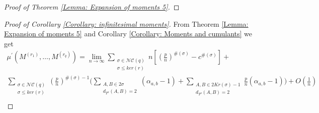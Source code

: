 \documentclass{article}
\newtheorem{corollary}  [theorem]{Corollary}
\theoremstyle{definition}
\newcommand{\E}{\mathbb{E}}
\newcommand{\NC}{\mathcal{NC}}
\begin{document}
{\begin{proof}[Proof of Theorem \ref{Lemma: Expansion of moments 5}]


\end{proof}

\begin{proof}[Proof of Corollary \ref{Corollary: infinitesimal moments}]
From Theorem \ref{Lemma: Expansion of moments 5} and Corollary \ref{Corollary: Moments and cumulants} we get
\begin{multline*}
\mu^\prime(M^{(r_1)},\dots,M^{(r_q)})= 
\lim_{n\rightarrow\infty} \sum_{\substack{\sigma\in \NC(q) \\ \sigma\leq ker(r)}}n\left[\left(\frac{p}{n}\right)^{\#(\sigma)}-c^{\#(\sigma)}\right]+ \\
\sum_{\substack{\sigma\in \NC(q) \\ \sigma\leq ker(r)}}\left(\frac{p}{n}\right)^{\#(\sigma)-1}\Bigg(\sum_{\substack{A,B\in 2\sigma \\ d_{T^\rho}(A,B)=2}}(\alpha_{a,b}-1)+\sum_{\substack{A,B\in 2Kr(\sigma)-1 \\ d_{T^\rho}(A,B)=2}}\frac{p}{n}(\alpha_{a,b}-1)\Bigg) +O(\frac{1}{n}) \\

\end{multline*}
\end{proof}}
\end{document}
